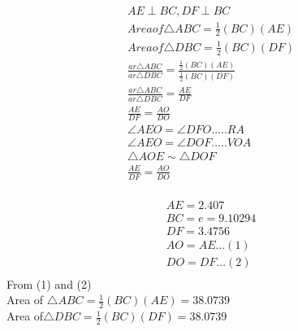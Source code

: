 \begin{frame}
\begin{align*}
AE\perp BC , DF\perp BC\\
Area of \triangle{ABC} = \frac{1}{2}(BC)(AE)\\
Area of \triangle{DBC} = \frac{1}{2}(BC)(DF)\\
\frac{ar\triangle{ABC}}{ar\triangle{DBC}}=\frac{\frac{1}{2}(BC)(AE)}{\frac{1}{2}(BC)(DF)}\\  
\frac{ar\triangle{ABC}}{ar\triangle{DBC}}=\frac{AE}{DF}\\
\frac{AE}{DF}=\frac{AO}{DO}\\
\angle{AEO}=\angle{DFO}..... RA\\
\angle{AEO}=\angle{DOF}..... VOA\\
\triangle{AOE} \sim \triangle{DOF}\\
\frac{AE}{DF}=\frac{AO}{DO}\\
\end{align*}
\end{frame}
\begin{frame}
\begin{align*}
AE=2.407\\
BC=e=9.10294\\
DF=3.4756\\
AO=AE...(1)\\
DO=DF...(2)\\
\end{align*}
From  (1) and  (2)\\
Area of $\triangle{ABC} = \frac{1}{2}(BC)(AE)  = 38.0739$\\
Area of$ \triangle{DBC} = \frac{1}{2}(BC)(DF)  = 38.0739$\\
\end{frame}
